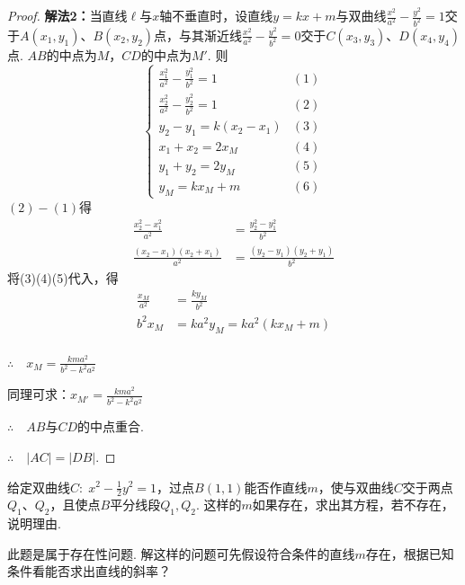 \begin{proof}
\begin{minipage}{.52\textwidth}
\end{minipage}

\textbf{解法2：}当直线$\ell$与$x$轴不垂直时，设直线$y=kx+m$与双曲线$\frac{x^2}{a^2}-\frac{y^2}{b^2}=1$交于$A(x_1,y_1)$、$B(x_2,y_2)$点，与其渐近线$\frac{x^2}{a^2}-\frac{y^2}{b^2}=0$交于$C(x_3,y_3)$、$D(x_4,y_4)$点. $AB$的中点为$M$，$CD$的中点为$M'$. 则
\[\begin{cases}
    \frac{x^2_1}{a^2}-\frac{y^2_1}{b^2}=1&(1)\\[1.5ex]
    \frac{x^2_2}{a^2}-\frac{y^2_2}{b^2}=1&(2)\\[1.5ex]
    y_2-y_1=k(x_2-x_1) &(3)\\
    x_1+x_2=2x_M &(4)\\
    y_1+y_2=2y_M &(5)\\
    y_M=kx_M+m &(6)
\end{cases}\]
$(2)-(1)$得
\[\begin{split}
    \frac{x^2_2-x^2_1}{a^2}&=\frac{y^2_2-y^2_1}{b^2}\\
    \frac{(x_2-x_1)(x_2+x_1)}{a^2}&=\frac{(y_2-y_1)(y_2+y_1)}{b^2}
\end{split}\]
将(3)(4)(5)代入，得
\[\begin{split}
    \frac{x_M}{a^2}&=\frac{ky_M}{b^2}\\
    b^2x_M&=ka^2 y_M=ka^2(kx_M+m)\\
\end{split}\]

$\therefore\quad x_M=\frac{kma^2}{b^2-k^2a^2}$

同理可求：$x_{M'}=\frac{kma^2}{b^2-k^2a^2}$

$\therefore\quad AB$与$CD$的中点重合.

$\therefore\quad |AC|=|DB|$.
\end{proof}

\begin{example}
    给定双曲线$C:\; x^2-\frac{1}{2}y^2=1$，过点$B(1,1)$能否作直线$m$，使与双曲线$C$交于两点$Q_1$、$Q_2$，且使点$B$平分线段$Q_1,Q_2$. 这样的$m$如果存在，求出其方程，若不存在，说明理由.
\end{example}

\begin{analyze}
    此题是属于存在性问题. 解这样的问题可先假设符合条件的直线$m$存在，根据已知条件看能否求出直线的斜率？
\end{analyze}

